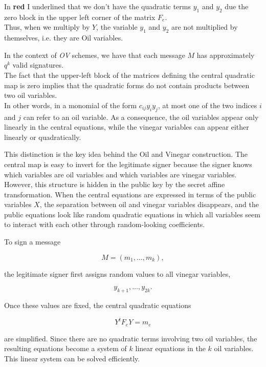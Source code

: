 \noindent
In {\color{red}\textbf{red}} I underlined that we don't have the quadratic terms $y_1$ and $y_2$ due the zero block in the upper left corner of the matrix $F_e$.\\ 
Thus, when we multiply by $Y$, the variable $y_1$ and $y_2$ are not multiplied by themselves, i.e. they are Oil variables.  
\vspace*{1em}

\noindent
In the context of \textit{OV} schemes, we have that each message $M$ has approximately $q^k$ valid signatures.\\
The fact that the upper-left block of the matrices defining the central quadratic map is zero implies that the quadratic forms do not contain products between two oil variables.\\
In other words, in a monomial of the form \(c_{ij}y_i y_j\), at most one of the two indices \(i\) and \(j\) can refer to an oil variable. As a consequence, the oil variables appear only linearly in the central equations, while the vinegar 
variables can appear either linearly or quadratically.
\medskip

\noindent
This distinction is the key idea behind the Oil and Vinegar construction. The central map is easy to invert for the legitimate signer because the signer knows which variables are oil variables and which variables are vinegar variables.\\
However, this structure is hidden in the public key by the secret affine transformation. When the central equations are expressed in terms of the public variables \(X\), the separation between oil and vinegar variables disappears, and 
the public equations look like random quadratic equations in which all variables seem to interact with each other through random-looking coefficients.
\medskip

\noindent
To sign a message

\[
M = (m_1,\ldots,m_k),
\]

\noindent
the legitimate signer first assigns random values to all vinegar variables,

\[
y_{k+1},\ldots,y_{2k}.
\]

\noindent
Once these values are fixed, the central quadratic equations

\[
Y^t F_e Y = m_e
\]

\noindent
are simplified. Since there are no quadratic terms involving two oil variables, the resulting equations become a system of \(k\) linear equations in the \(k\) oil variables. This linear system can be solved efficiently.
\medskip

